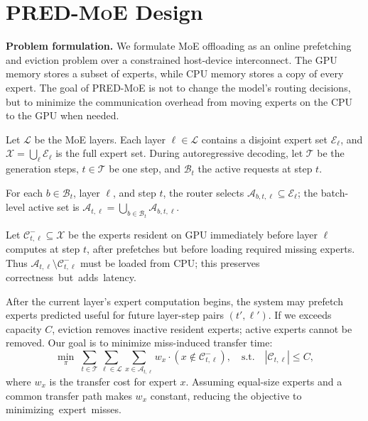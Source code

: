 \documentclass[sigconf]{acmart}
\newcommand{\sysname}{\textsc{PRED-MoE}\xspace}
\newcommand{\sys}{\sysname}
\begin{document}
\section{\sysname Design}
\vspace{-.5mm}
\textbf{Problem formulation.}
We formulate MoE offloading as an online prefetching and eviction problem over a constrained host-device interconnect.
The GPU memory stores a subset of experts, while CPU memory stores a
copy of every expert. The goal of \sys is not to change the model's
routing decisions, but to minimize the communication overhead from moving experts on the CPU to the GPU when needed. 



Let $\mathcal{L}$ be the MoE layers. Each layer $\ell\in\mathcal{L}$ contains a disjoint expert set $\mathcal{E}_\ell$, and $\mathcal{X}=\bigcup_\ell \mathcal{E}_\ell$ is the full expert set. During autoregressive decoding, let $\mathcal{T}$ be the generation steps, $t\in\mathcal{T}$ be one step, and $\mathcal{B}_t$ the active requests at step $t$.

For each $b\in\mathcal{B}_t$, layer $\ell$, and step $t$, the router selects $\mathcal{A}_{b,t,\ell}\subseteq \mathcal{E}_\ell$; the batch-level active set is $\mathcal{A}_{t,\ell}=\bigcup_{b\in\mathcal{B}_t}\mathcal{A}_{b,t,\ell}$.

Let $\mathcal{C}^{-}_{t,\ell}\subseteq\mathcal{X}$ be the experts resident on GPU immediately before layer $\ell$ computes at step $t$, after prefetches but before loading required missing experts. Thus $\mathcal{A}_{t,\ell}\setminus \mathcal{C}^{-}_{t,\ell}$ must be loaded from CPU; this preserves \mbox{correctness but adds latency.}

After the current layer's expert computation begins, the system may prefetch experts predicted useful for future layer-step pairs $(t',\ell')$. If we exceeds capacity $C$, eviction removes inactive resident experts; active experts cannot be removed. Our goal is to minimize miss-induced transfer time:
\vspace{-.5mm}
\begin{equation*}
\label{eq:cache-objective}
\min_{\pi}\;
\sum_{t\in\mathcal{T}}
\sum_{\ell\in\mathcal{L}}
\sum_{x\in\mathcal{A}_{t,\ell}}
w_x \cdot \left(x\notin\mathcal{C}^{-}_{t,\ell}\right),
\quad
\text{s.t.}\quad
|\mathcal{C}_{t,\ell}|\le C ,
\end{equation*}
\vspace{-.5mm}
%
where $w_x$ is the transfer cost for expert $x$. Assuming equal-size experts and a common transfer path makes $w_x$ constant, reducing the objective to \mbox{minimizing expert misses.}
\end{document}

